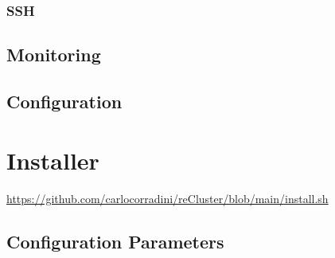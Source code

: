 \subsubsection{SSH}
\label{subsubsec:implementation_server_scale_up_ssh}

\subsection{Monitoring}
\label{subsec:implementation_server_monitoring}


\subsection{Configuration}
\label{subsec:implementation_server_configuration}

\section{Installer}
\label{sec:implementation_installer}

\url{https://github.com/carlocorradini/reCluster/blob/main/install.sh}

\subsection{Configuration Parameters}
\label{subsec:implementation_installer_configuration_parameters}

